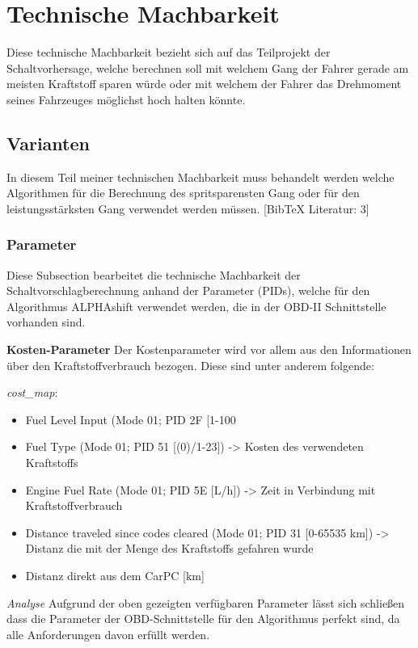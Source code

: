 \chapter {Technische Machbarkeit}
Diese technische Machbarkeit bezieht sich auf das Teilprojekt der Schaltvorhersage, welche berechnen soll mit welchem Gang der Fahrer gerade am meisten Kraftstoff sparen würde oder mit welchem der Fahrer das Drehmoment seines Fahrzeuges möglichst hoch halten könnte.	
\section {Varianten}
In diesem Teil meiner technischen Machbarkeit muss behandelt werden welche Algorithmen für die Berechnung des spritsparensten Gang oder für den leistungsstärksten Gang verwendet werden müssen.
[BibTeX Literatur: 3]
\subsection {Parameter}
Diese Subsection bearbeitet die technische Machbarkeit der Schaltvorschlagberechnung anhand der Parameter (PIDs), welche für den Algorithmus ALPHAshift verwendet werden, die in der OBD-II Schnittstelle vorhanden sind.

\textbf{Kosten-Parameter}
Der Kostenparameter wird vor allem aus den Informationen über den Kraftstoffverbrauch bezogen. 
Diese sind unter anderem folgende:

\textit{cost_map}:
\begin{itemize}
	\item Fuel Level Input (Mode 01; PID 2F [1-100%
	\item Fuel Type (Mode 01; PID 51 [(0)/1-23]) -> Kosten des verwendeten Kraftstoffs
	\item Engine Fuel Rate (Mode 01; PID 5E [L/h]) -> Zeit in Verbindung mit Kraftstoffverbrauch 
	\item Distance traveled since codes cleared (Mode 01; PID 31 [0-65535 km]) -> Distanz die mit der Menge des Kraftstoffs gefahren wurde
	\item Distanz direkt aus dem CarPC [km]
\end{itemize}

\textit{Analyse}
Aufgrund der oben gezeigten verfügbaren Parameter lässt sich schließen dass die Parameter der OBD-Schnittstelle für den Algorithmus perfekt sind, da alle Anforderungen davon erfüllt werden.

